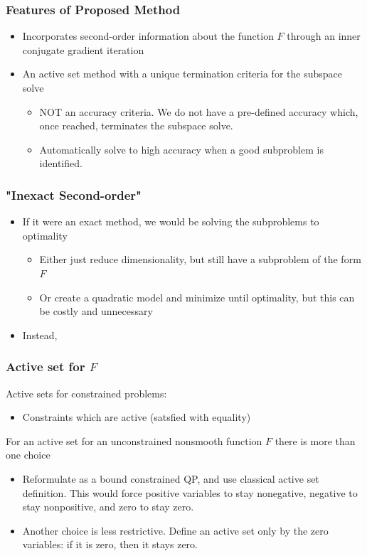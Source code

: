 \documentclass{beamer}
\begin{document}
	\begin{frame}
		\frametitle{Features of Proposed Method}
		\begin{itemize}
		\item Incorporates second-order information about the function $F$ through an inner conjugate gradient iteration \\
		\pause \item An active set method with a unique termination criteria for the subspace solve \\
		\begin{itemize}
		\item NOT an accuracy criteria. We do not have a pre-defined accuracy which, once reached, terminates the subspace solve.
		\item Automatically solve to high accuracy when a good subproblem is identified. 
		\end{itemize}
		\end{itemize}
	\end{frame}
	


	\begin{frame}
		\frametitle{"Inexact Second-order"}
		\begin{itemize}
			\item If it were an exact method, we would be solving the subproblems to optimality
			\begin{itemize}
				\item Either just reduce dimensionality, but still have a subproblem of the form $F$
				\item Or create a quadratic model and minimize until optimality, but this can be costly and unnecessary
			\end{itemize}
			\item Instead, 
		\end{itemize}
	\end{frame}
	\begin{frame}
		\frametitle{Active set for $F$}
		Active sets for constrained problems:
		\begin{itemize}
		\item Constraints which are active (satsfied with equality)
		\end{itemize}
		For an active set for an unconstrained nonsmooth function $F$ there is more than one choice
		\begin{itemize}
		\item Reformulate as a bound constrained QP, and use classical active set definition. This would force positive variables to stay nonegative, negative to stay nonpositive, and zero to stay zero. \\
		\item Another choice is less restrictive. Define an active set only by the zero variables: if it is zero, then it stays zero.
		\end{itemize}
	\end{frame}
	
\end{document}

